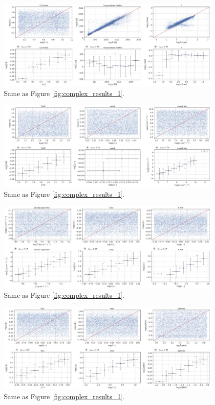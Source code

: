 \begin{figure} [!htb]
    \centering
    \includegraphics[width=\textwidth,keepaspectratio]{figuren/results7.png}
    \caption{Same as Figure \ref{fig:complex_results_1}.}
    \label{fig:complex_results_7}
\end{figure}

\begin{figure} [!htb]
    \centering
    \includegraphics[width=\textwidth,keepaspectratio]{figuren/results8.png}
    \caption{Same as Figure \ref{fig:complex_results_1}.}
    \label{fig:complex_results_8}
\end{figure}

\begin{figure} [!htb]
    \centering
    \includegraphics[width=\textwidth,keepaspectratio]{figuren/results9.png}
    \caption{Same as Figure \ref{fig:complex_results_1}.}
    \label{fig:complex_results_9}
\end{figure}

\begin{figure} [!htb]
    \centering
    \includegraphics[width=\textwidth,keepaspectratio]{figuren/results10.png}
    \caption{Same as Figure \ref{fig:complex_results_1}.}
    \label{fig:complex_results_10}
\end{figure}






